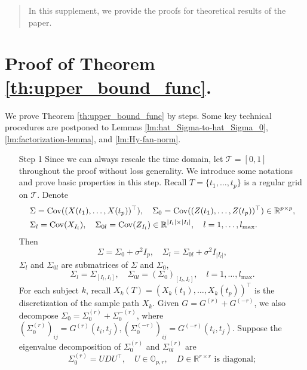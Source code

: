 \documentclass[11pt]{article}
\newcommand{\0}{{\mathbf{0}}}
\newcommand{\1}{{\mathbf{1}}}
\newcommand{\Cov}{{\rm Cov}}
\begin{document}
\begin{abstract}
	In this supplement, we provide the proofs for theoretical results of the paper.
\end{abstract}


\section{Proof of Theorem \ref{th:upper_bound_func}.} 

We prove Theorem \ref{th:upper_bound_func} by steps. Some key technical procedures are postponed to Lemmas  \ref{lm:hat_Sigma-to-hat_Sigma_0}, \ref{lm:factorization-lemma}, and \ref{lm:Hy-fan-norm}. 

\begin{enumerate}[leftmargin=*]
	\item[Step 1] Since we can always rescale the time domain, let $\mathcal{T} = [0, 1]$ throughout the proof without loss generality. We introduce some notations and prove basic properties in this step. Recall $T = \{t_1,\ldots, t_p\}$ is a regular grid on $\mathcal{T}$. Denote 
	\begin{equation}
	\begin{split}
	& \Sigma = \Cov((X(t_1), \ldots, X(t_p))^\top), \quad\Sigma_0 = \Cov((Z(t_1), \ldots, Z(t_p))^\top) \in \mathbb{R}^{p\times p}, \\
	& \Sigma_l = \Cov(X_{I_l}), \quad \Sigma_{0l} = \Cov(Z_{I_l})  \in \mathbb{R}^{|I_l|\times|I_l|},\quad l=1,\ldots, l_{\max}.
	\end{split}
	\end{equation} 
	Then
	$$\Sigma = \Sigma_0 + \sigma^2I_p, \quad \Sigma_{l} = \Sigma_{0l} + \sigma^2 I_{|I_l|},$$ 
	$\Sigma_l$ and $\Sigma_{0l}$ are submatrices of $\Sigma$ and $\Sigma_0$,
	\begin{equation}\label{eq:def-Sigma-01}
	\Sigma_l = \Sigma_{[I_l, I_l]},\quad \Sigma_{0l} = (\Sigma_0)_{[I_l, I_l]}, \quad l=1,\ldots, l_{\max}.
	\end{equation}
	For each subject $k$, recall $X_k(T) = (X_k(t_1), \ldots, X_k(t_p))^\top$ is the discretization of the sample path $X_k$. Given $G = G^{(r)} + G^{(-r)}$, we also decompose $\Sigma_0 = \Sigma_0^{(r)} + \Sigma_0^{-(r)}$, where $(\Sigma_0^{(r)})_{ij} = G^{(r)}(t_i, t_j), (\Sigma_0^{(-r)})_{ij} = G^{(-r)}(t_i, t_j)$. Suppose the eigenvalue decomposition of $\Sigma_0^{(r)}$ and $\Sigma_{0l}^{(r)}$ are
	\begin{equation}
	\Sigma_{0}^{(r)} = UDU^\top,\quad U\in \mathbb{O}_{p, r},\quad D \in\mathbb{R}^{r\times r} \text{ is diagonal};

\end{equation}
\end{enumerate}
\end{document}
